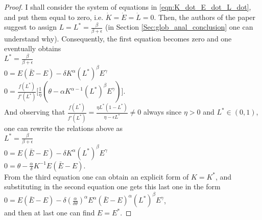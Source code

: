 \begin{proof}
	I shall consider the system of equations in \eqref{eqn:K_dot_E_dot_L_dot}, and put them equal to zero, i.e. $\dot{K}=\dot{E}=\dot{L}=0$. Then, the authors of the paper suggest to assign $L=L^*=\frac{\beta}{\beta+\epsilon}$ (in Section \ref{Sec:glob_anal_conclusion} one can understand why). Consequently, the first equation becomes zero and one eventually obtains \\
	$L^* = \frac{\beta}{\beta+\epsilon}$\\
	$0=E(\bar{E}-E)-\delta K^\alpha (L^*)^\beta E^\gamma$\\
	$0=\frac{f(L^*)}{f'(L^*)}\Big[\frac{1}{\eta}(\theta-\alpha K^{\alpha-1}(L^*)^\beta E^\gamma) \Big]$.\\
	And observing that $\frac{f(L^*)}{f'(L^*)}=\frac{\eta L^*(1-L^*)}{\eta-\epsilon L^*}\neq0$ always since $\eta>0$ and $L^* \in (0,1)$, one can rewrite the relations above as \\
	$L^* = \frac{\beta}{\beta+\epsilon}$\\
	$0=E(\bar{E}-E)-\delta K^\alpha (L^*)^\beta E^\gamma$\\
	$0=\theta-\frac{\alpha}{\delta} K^{-1}E(\bar{E}-E)$.\\
	From the third equation one can obtain an explicit form of $K=K^*$, and substituting in the second equation one gets this last one in the form \\
	$0=E(\bar{E}-E)-\delta(\frac{\alpha}{\delta\theta})^\alpha E^\alpha(\bar{E}-E)^\alpha (L^*)^\beta E^\gamma$, \\
	and then at last one can find $E=E^*$.
	

\end{proof}

